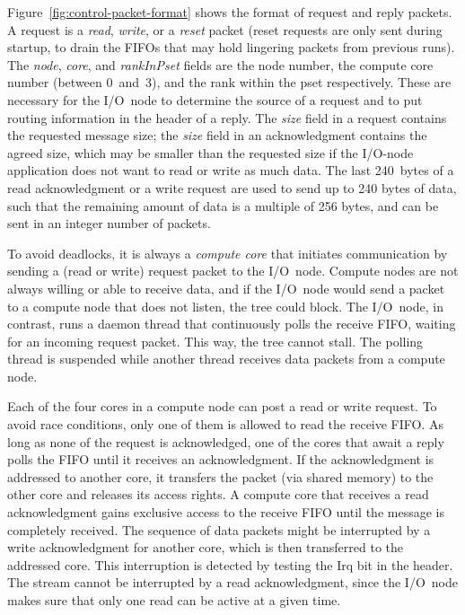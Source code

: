 \documentclass[journal]{IEEEtran}
\begin{document}
Figure~\ref{fig:control-packet-format} shows the format of request and reply
packets.
A request is a \emph{read}, \emph{write}, or a \emph{reset\/} packet
(reset requests are only sent during startup, to drain the FIFOs that may hold
lingering packets from previous runs).
The \emph{node}, \emph{core}, and \emph{rankInPset} fields are the node number,
the compute core number (between 0~and~3), and the rank within the pset
respectively.
These are necessary for the I/O~node to determine the source of a request
and to put routing information in the header of a reply.
The \emph{size} field in a request contains the requested message size;
the \emph{size} field in an acknowledgment contains the agreed size, which
may be smaller than the requested size if the I/O-node application does not
want to read or write as much data.
The last 240~bytes of a read acknowledgment or a write request are used to
send up to 240 bytes of data, such that the remaining amount of data is a
multiple of 256 bytes, and can be sent in an integer number of packets.

To avoid deadlocks, it is always a \emph{compute core\/} that initiates
communication by sending a (read or write) request packet to the I/O~node.
Compute nodes are not always willing or able to receive data, and
if the I/O~node would send a packet to a compute node that does not listen,
the tree could block.
The I/O~node, in contrast, runs a daemon thread that continuously polls the
receive FIFO, waiting for an incoming request packet.
This way, the tree cannot stall.
The polling thread is suspended while another thread receives data packets
from a compute node.

Each of the four cores in a compute node can post a read or write request.
To avoid race conditions, only one of them is allowed to read the receive FIFO.
As long as none of the request is acknowledged, one of the cores that await
a reply polls the FIFO until it receives an acknowledgment.
If the acknowledgment is addressed to another core, it transfers the packet
(via shared memory) to the other core and releases its access rights.
A compute core that receives a read acknowledgment gains exclusive access to
the receive FIFO until the message is completely received.
The sequence of data packets might be interrupted by a write acknowledgment
for another core, which is then transferred to the addressed core.
This interruption is detected by testing the Irq bit in the header.
The stream cannot be interrupted by a read acknowledgment, since the I/O~node
makes sure that only one read can be active at a given time.
\end{document}
